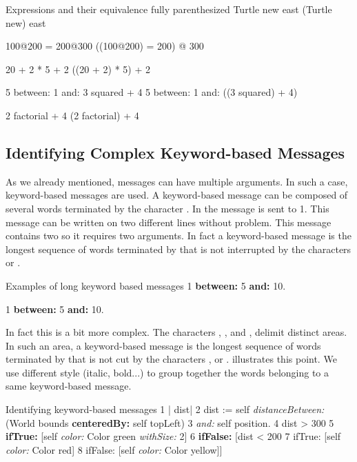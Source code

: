 \begin{scriptwithtitle}{Expressions and their equivalence fully parenthesized}
Turtle new east 
    (Turtle new) east

100@200 = 200@300
	((100@200) = 200) @ 300
	
20 + 2 * 5 + 2
   ((20 + 2) * 5) + 2

5 between: 1 and: 3 squared + 4
   5 between: 1 and: ((3 squared) + 4)

2 factorial + 4
    (2 factorial) + 4
\end{scriptwithtitle}



\subsection{Identifying Complex Keyword-based Messages}

As we already mentioned, messages can have multiple arguments. In such a case, keyword-based messages are used. A keyword-based message can be composed of several words terminated by the character \ct{:}. In  the message  is sent to 1. This message can be written on two different lines without problem. This message contains two \ct{:} so it requires two arguments. In fact a keyword-based message is the longest sequence of words terminated by \ct{:} that is not interrupted by the characters  or \ct{;}.

\begin{scriptwithtitle}{Examples of long keyword based messages}\label{scr:longkey}
1 \textbf{between:} 5 \textbf{and:} 10.

1 \textbf{between:} 5 
  \textbf{and:} 10.
\end{scriptwithtitle}

In fact this is a bit more complex. The characters \ct{[}, \ct{]}, and \ct{(}, \ct{)} delimit distinct areas. In such an area, a keyword-based message is the longest sequence  of words terminated by \ct{:} that is not cut by the characters ,  or \ct{;}.   illustrates this point.
We use different style (italic, bold...) to group together the words belonging to a same keyword-based message.

\begin{scriptwithtitle}{Identifying keyword-based messages}\label{scr:keywordComplex}
1   | dist| 
2   dist := self \textit{distanceBetween:} (World bounds \textbf{centeredBy:} self topLeft)
3                \textit{and:} self position.
4   dist > 300
5      \textbf{ifTrue:} [self \textit{color:} Color green \textit{withSize:} 2]
6      \textbf{ifFalse:} [dist < 200
7         ifTrue: [self \textit{color:} Color red]
8         ifFalse: [self \textit{color:} Color yellow]]
\end{scriptwithtitle}

